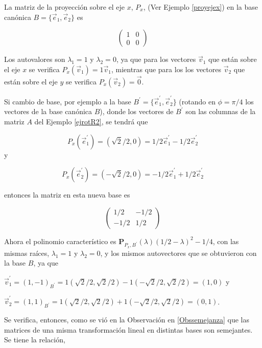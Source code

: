 \begin{example}
La matriz de la proyección sobre el eje $x$, $ P_x$, (Ver Ejemplo \ref{proyejex}) en la base canónica $B=\{\vec{e}_1, \vec{e}_2 \}  $ es 

$$\left(\begin{array}{cc}  1 & 0  \\ 0 &  0
\end{array}
 \right)$$

 \bigskip
 
 Los autovalores son $\lambda_1=1$ y $\lambda_2=0$, ya que para los vectores $\vec{v}_1$ que están sobre el eje $x$ se verifica $P_x(\vec{v}_1)=1\vec{v}_1$, mientras que para los los vectores $\vec{v}_2$ que están sobre el eje $y$ se verifica $P_x(\vec{v}_2)=\Vec{0}$.
 
\bigskip
Si cambio de base, por ejemplo a la base $B^{\prime}= \{\vec{e}_1^{\prime}, \vec{e}_2^{\prime} \} $ (rotando  en $ \phi= \pi/4$ los vectores de la base canónica $B$),  donde los vectores de $B^{\prime}$ son las columnas de la matriz $A$ del Ejemplo \ref{ejrotR2}, se tendrá que 

$$ P_x( \vec{e}_1^{\prime})=(\sqrt 2/2,0)= 1/2 \vec{e}_1^{\prime} -1/2 \vec{e}_2^{\prime} $$
y 

$$ P_x( \vec{e}_2^{\prime})=(-\sqrt 2 /2,0)= -1/2 \vec{e}_1^{\prime} +1/2 \vec{e}_2^{\prime} $$

\noindent
entonces la matriz en esta nueva base es

$$\left(\begin{array}{cc}  1/2 & -1/2  \\ -1/2 &  1/2
\end{array}
 \right)$$

 \bigskip

 Ahora el polinomio característico es $\mathbf{P}_{P_x,B^{\prime}}(\lambda)(1/2-\lambda)^2 -1/4$, con las mismas raíces, $\lambda_1=1$ y $\lambda_2=0$, y los mismos autovectores que se obtuvieron con la base $B$, ya que

 \bigskip
 
 $\vec{v}^{\prime}_1= (1,-1)_{B^{\prime}}= 1(\sqrt 2 /2,\sqrt 2 /2)-1(-\sqrt 2 /2,\sqrt 2 /2)=(1,0)$ y
 
 \bigskip
 
 $\vec{v}^{\prime}_2= (1,1)_{B^{\prime}}=1(\sqrt 2 /2,\sqrt 2 /2)+1(-\sqrt 2 /2,\sqrt 2 /2)=(0,1)$.

 \bigskip
 
 Se verifica, entonces, como se vió en la  Observación 
 \textcolor{blue}{{\selectfont{i}}} en  \ref{Obssemejanza} que las matrices de una misma transformación lineal en distintas bases son semejantes.  
Se tiene la relación, 


\end{example}
